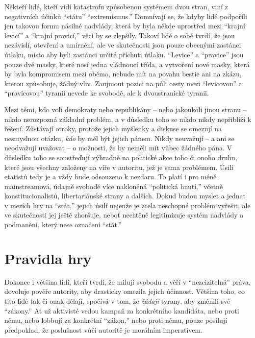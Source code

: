 \documentclass{book}
\begin{document}
Někteří lidé, kteří vidí katastrofu způsobenou systémem dvou stran, viní z negativních účinků \enquote{státu} \enquote{extremismus.} Domnívají se, že kdyby lidé podpořili jen takovou formu násilné nadvlády, která by byla někde uprostřed mezi \enquote{krajní levicí} a \enquote{krajní pravicí,} věci by se zlepšily. Takoví lidé o sobě tvrdí, že jsou nezávislí, otevření a umírnění, ale ve skutečnosti jsou pouze obecnými zastánci útlaku, místo aby byli zastánci určité příchuti útlaku. \enquote{Levice} a \enquote{pravice} jsou pouze dvě masky, které nosí jedna vládnoucí třída, a vytvoření nové masky, která by byla kompromisem mezi oběma, nebude mít na povahu bestie ani na zkázu, kterou způsobuje, žádný vliv. Zaujmout pozici na půli cesty mezi \enquote{levicovou} a \enquote{pravicovou} tyranií nevede ke svobodě, ale k dvoustranické tyranii.

Mezi těmi, kdo volí demokraty nebo republikány -- nebo jakoukoli jinou stranu -- nikdo nerozpozná základní problém, a v důsledku toho se nikdo nikdy nepřiblíží k řešení. Zůstávají otroky, protože jejich myšlenky a diskuse se omezují na nesmyslnou otázku, \emph{kdo} by měl být jejich pánem. Nikdy neuvažují -- a ani se neodvažují uvažovat -- o možnosti, že by neměli mít vůbec žádného pána. V důsledku toho se soustřeďují výhradně na politické akce toho či onoho druhu, které jsou všechny založeny na víře v autoritu, jež je sama problémem. Úsilí etatistů tedy je a vždy bude odsouzeno k nezdaru. To platí i pro méně mainstreamová, údajně svobodě více nakloněná \enquote{politická hnutí,} včetně konstitucionalistů, libertariánské strany a dalších. Dokud budou myslet a jednat v mezích hry na \enquote{stát,} jejich úsilí nejenže je zcela neschopné problém vyřešit, ale ve skutečnosti jej ještě zhoršuje, neboť nechtěně legitimizuje systém nadvlády a podmanění, který nese označení \enquote{stát.}

\section{Pravidla hry}

Dokonce i většina lidí, kteří tvrdí, že milují svobodu a věří v \enquote{nezcizitelná} práva, dovoluje pověře autority, aby drasticky omezila jejich účinnost. Většina toho, co tito lidé tak či onak dělají, spočívá v tom, že \emph{žádají} tyrany, aby změnili své \enquote{zákony.} Ať už aktivisté vedou kampaň za konkrétního kandidáta, nebo proti němu, nebo lobbují za konkrétní \enquote{zákon,} nebo proti němu, pouze posilují předpoklad, že poslušnost vůči autoritě je morálním imperativem.
\end{document}
